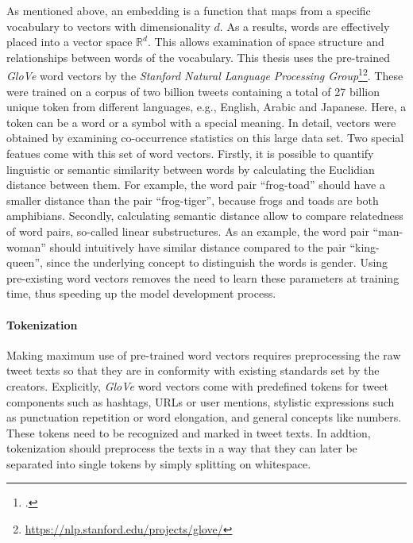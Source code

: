 As mentioned above, an embedding is a function that maps from a specific
vocabulary to vectors with dimensionality $d$.
As a results, words are effectively placed into a vector space $\mathbb{R}^d$.
This allows examination of space structure and relationships between words of 
the vocabulary.
This thesis uses the pre-trained \textit{GloVe} word vectors by the \textit{Stanford
Natural Language Processing Group}\footcite{Pennington2014}\footnote{\url{https://nlp.stanford.edu/projects/glove/}}.
These were trained on a corpus of two billion tweets containing a total of
27 billion unique token from different languages, e.g., English, Arabic and
Japanese.
Here, a token can be a word or a symbol with a special meaning.
In detail, vectors were obtained by examining co-occurrence statistics on this
large data set.
Two special featues come with this set of word vectors.
Firstly, it is possible to quantify linguistic or semantic similarity between
words by calculating the Euclidian distance between them.
For example, the word pair ``frog-toad'' should have a smaller distance than
the pair ``frog-tiger'', because frogs and toads are both amphibians.
Secondly, calculating semantic distance allow to compare relatedness of word
pairs, so-called linear substructures.
As an example, the word pair ``man-woman'' should intuitively have similar distance
compared to the pair ``king-queen'', since the underlying concept to distinguish
the words is gender.
Using pre-existing word vectors removes the need to learn these parameters
at training time, thus speeding up the model development process.

\paragraph{Tokenization}
\label{sub:tokenization}

Making maximum use of pre-trained word vectors requires preprocessing the raw
tweet texts so that they are in conformity with existing standards set by
the creators.
Explicitly, \textit{GloVe} word vectors come with predefined tokens for tweet
components such as hashtags, URLs or user mentions, stylistic expressions such
as punctuation repetition or word elongation, and general concepts like numbers.
These tokens need to be recognized and marked in tweet texts.
In addtion, tokenization should preprocess the texts in a way that they can
later be separated into single tokens by simply splitting on whitespace.

